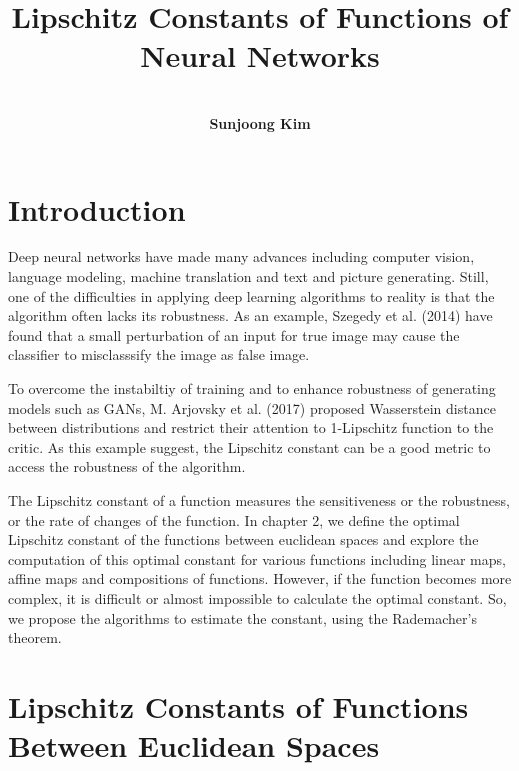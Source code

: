 \documentclass[12pt]{report}
\numberwithin{figure}{chapter}
\theoremstyle{plain}
\theoremstyle{definition}
\theoremstyle{corollary}
\theoremstyle{definition}
\theoremstyle{plain}
\theoremstyle{definition}
\theoremstyle{plain}
\begin{document}
\title{\textbf{Lipschitz Constants of Functions of Neural Networks}}
\author{\\\textbf{Sunjoong Kim}\\}
\setcounter{tocdepth}{1}
\date{}
 \maketitle{}

\tableofcontents

\newpage
\begin{abstract}

\end{abstract}
\newpage
\setcounter{page}{1} \setcounter{section}{0}


\chapter{Introduction}

Deep neural networks have made many advances including computer vision, language modeling, machine translation and text and picture generating.
Still, one of the difficulties in applying deep learning algorithms to reality is that the algorithm often lacks its robustness.
As an example, Szegedy et al. (2014) have found that a small perturbation of an input for true image may cause the classifier to misclasssify the image as false image.

To overcome the instabiltiy of training and to enhance robustness of generating models such as GANs, M. Arjovsky et al. (2017) proposed Wasserstein distance between distributions and restrict their attention to 1-Lipschitz function to the critic.
As this example suggest, the Lipschitz constant can be a good metric to access the robustness of the algorithm.

The Lipschitz constant of a function measures the sensitiveness or the robustness, or the rate of changes of the function.
In chapter 2, we define the optimal Lipschitz constant of the functions between euclidean spaces and explore the computation of this optimal constant for various functions including linear maps, affine maps and compositions of functions.
However, if the function becomes more complex, it is difficult or almost impossible to calculate the optimal constant.
So, we propose the algorithms to estimate the constant, using the Rademacher's theorem.

\chapter{Lipschitz Constants of Functions Between Euclidean Spaces}
\end{document}
